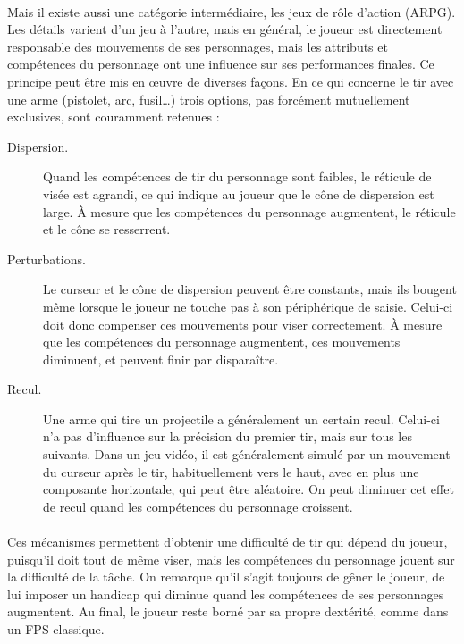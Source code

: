 	\paragraph{}
	Mais il existe aussi une catégorie intermédiaire, les jeux de rôle d'action (ARPG). Les détails varient d'un jeu à l'autre, mais en général, le joueur est directement responsable des mouvements de ses personnages, mais les attributs et compétences du personnage ont une influence sur ses performances finales. Ce principe peut être mis en œuvre de diverses façons. En ce qui concerne le tir avec une arme (pistolet, arc, fusil\ldots{}) trois options, pas forcément mutuellement exclusives, sont couramment retenues :
	\begin{description}
		\item[Dispersion.] Quand les compétences de tir du personnage sont faibles, le réticule de visée est agrandi, ce qui indique au joueur que le cône de dispersion est large. À mesure que les compétences du personnage augmentent, le réticule et le cône se resserrent.
		\item[Perturbations.] Le curseur et le cône de dispersion peuvent être constants, mais ils bougent même lorsque le joueur ne touche pas à son périphérique de saisie. Celui-ci doit donc compenser ces mouvements pour viser correctement. À mesure que les compétences du personnage augmentent, ces mouvements diminuent, et peuvent finir par disparaître.
		\item[Recul.] Une arme qui tire un projectile a généralement un certain recul. Celui-ci n'a pas d'influence sur la précision du premier tir, mais sur tous les suivants. Dans un jeu vidéo, il est généralement simulé par un mouvement du curseur après le tir, habituellement vers le haut, avec en plus une composante horizontale, qui peut être aléatoire. On peut diminuer cet effet de recul quand les compétences du personnage croissent.
	\end{description}

	\paragraph{}
	Ces mécanismes permettent d'obtenir une difficulté de tir qui dépend du joueur, puisqu'il doit tout de même viser, mais les compétences du personnage jouent sur la difficulté de la tâche. On remarque qu'il s'agit toujours de gêner le joueur, de lui imposer un handicap qui diminue quand les compétences de ses personnages augmentent. Au final, le joueur reste borné par sa propre dextérité, comme dans un FPS classique.
	
